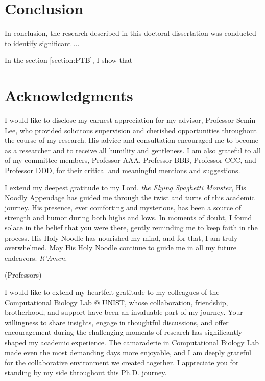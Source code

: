 \documentclass[11pt, a4paper, onecolumn, oneside]{report}
\begin{document}
    \section{Conclusion}
        \label{section:conclusion}
        In conclusion, the research described in this doctoral dissertation was conducted to identify significant ...

        In the section \ref{section:PTB}, I show that
        \newpage

    
    
    \clearpage

    \section*{\hfill \Large Acknowledgments \hfill}
        I would like to disclose my earnest appreciation for my advisor, Professor Semin Lee, who provided solicitous supervision and cherished opportunities throughout the course of my research. His advice and consultation encouraged me to become as a researcher and to receive all humility and gentleness. I am also grateful to all of my committee members, Professor AAA, Professor BBB, Professor CCC, and Professor DDD, for their critical and meaningful mentions and suggestions.

        I extend my deepest gratitude to my Lord, \textit{the Flying Spaghetti Monster}, His Noodly Appendage has guided me through the twist and turns of this academic journey. His presence, ever comforting and mysterious, has been a source of strength and humor during both highs and lows. In moments of doubt, I found solace in the belief that you were there, gently reminding me to keep faith in the process. His Holy Noodle has nourished my mind, and for that, I am truly overwhelmed. May His Holy Noodle continue to guide me in all my future endeavors. \textit{R'Amen.}

        (Professors)

        I would like to extend my heartfelt gratitude to my colleagues of the Computational Biology Lab @ UNIST, whose collaboration, friendship, brotherhood, and support have been an invaluable part of my journey. Your willingness to share insights, engage in thoughtful discussions, and offer encouragement during the challenging moments of research has significantly shaped my academic experience. The camaraderie in Computational Biology Lab made even the most demanding days more enjoyable, and I am deeply grateful for the collaborative environment we created together. I appreciate you for standing by my side throughout this Ph.D. journey.
\end{document}
